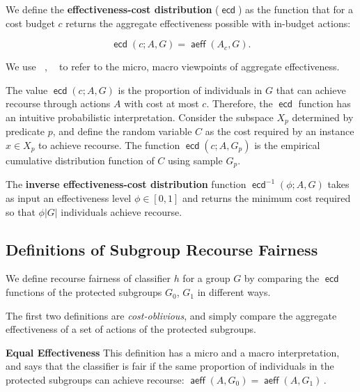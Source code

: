\documentclass{article}
\DeclareMathOperator{\aeff}{\mathsf{aeff}}
\DeclareMathOperator{\ecd}{\mathsf{ecd}}
\DeclareMathOperator{\ecdmi}{\mathsf{ecd_{\mu}}}
\DeclareMathOperator{\ecdma}{\mathsf{ecd_M}}
\begin{document}
We define the \textbf{effectiveness-cost distribution} ($\ecd$) as the function that for a cost budget $c$ returns the aggregate effectiveness possible with in-budget actions:

\[
\ecd(c; A, G) = \aeff(A_c,G).
\]

We use $\ecdmi$, $\ecdma$ to refer to the micro, macro viewpoints of aggregate effectiveness.

The value $\ecd(c; A, G)$ is the proportion of individuals in $G$ that can achieve recourse through actions $A$ with cost at most $c$. Therefore, the $\ecd$ function has an intuitive probabilistic interpretation. 
Consider the subspace $X_p$ determined by predicate $p$, and define the random variable $C$ as the cost required by an instance $x \in X_p$ to achieve recourse. The function $\ecd(c; A, G_p)$ is the empirical cumulative distribution function of $C$ using sample $G_p$.

The \textbf{inverse effectiveness-cost distribution} function $\ecd^{-1}(\phi; A, G)$ takes as input an effectiveness level $\phi \in [0, 1]$ and returns the minimum cost required so that $\phi |G|$ individuals achieve recourse.


\subsection{Definitions of Subgroup Recourse Fairness}
\label{sec:fairdef}

We define recourse fairness of classifier $h$ for a group $G$ by comparing the $\ecd$ functions of the protected subgroups $G_{0}$, $G_{1}$ in different ways.

The first two definitions are \emph{cost-oblivious}, and simply compare the aggregate effectiveness of a set of actions of the protected subgroups.

\smallskip\noindent\textbf{Equal Effectiveness}
%
This definition has a micro and a macro interpretation, and says that the classifier is fair if the same proportion of individuals in the protected subgroups can achieve recourse: 
$\aeff(A, G_{0}) = \aeff(A, G_{1})\,.$
%
%

\end{document}
